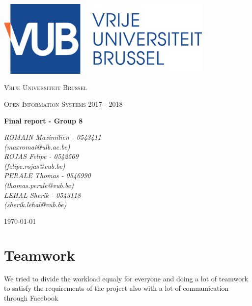 \documentclass[a4paper,12pt]{article}
\begin{document}
\begin{titlepage}
    \centering
    \includegraphics[width=0.8\textwidth]{logo.eps}\par\vspace{1cm}
    {\scshape\LARGE Vrije Universiteit Brussel\par}
    \vspace{1cm}
    {\scshape\Large Open Information Systems 2017 - 2018\par}
    \vspace{1.5cm}
    {\huge\bfseries Final report - Group 8\par}
    \vspace{2cm}
    {\Large\itshape ROMAIN Maximilien - 0543411\\ (maxromai@ulb.ac.be)\\ ROJAS Felipe - 0542569\\ (felipe.rojas@vub.be)\\PERALE Thomas - 0546990\\ (thomas.perale@vub.be)\\ LEHAL Sherik - 0543118\\ (sherik.lehal@vub.be)\par}
    \vfill

    {\large \today\par}
\end{titlepage}

\newpage


\section{Teamwork}
We tried to divide the workload equaly for everyone and doing a lot of teamwork to satisfy the requirements of the project also with a lot of communication through Facebook
\end{document}
